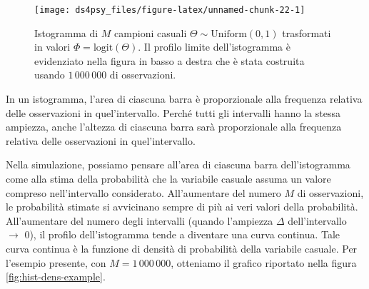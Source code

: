 \documentclass[
  11pt,
]{krantz}
\theoremstyle{definition}
\theoremstyle{definition}
\theoremstyle{definition}
\theoremstyle{definition}
\theoremstyle{remark}
\begin{document}
\begin{figure}[h]

{\centering \texttt{[image: ds4psy\_files/figure-latex/unnamed-chunk-22-1]} 

}

\caption{Istogramma di $M$ campioni casuali $\Theta \sim \mbox{Uniform}(0, 1)$ trasformati in valori $\Phi = \mbox{logit}(\Theta).$ Il profilo limite dell'istogramma è evidenziato nella figura in basso a destra che è stata costruita usando $1\,000\,000$ di osservazioni.}\label{fig:unnamed-chunk-22}
\end{figure}

In un istogramma, l'area di ciascuna barra è proporzionale alla frequenza relativa delle osservazioni in quel'intervallo. Perché tutti gli intervalli hanno la stessa ampiezza, anche l'altezza di ciascuna barra sarà proporzionale alla frequenza relativa delle osservazioni in quel'intervallo.

Nella simulazione, possiamo pensare all'area di ciascuna barra dell'istogramma come alla stima della probabilità che la variabile casuale assuma un valore compreso nell'intervallo considerato. All'aumentare del numero \(M\) di osservazioni, le probabilità stimate si avvicinano sempre di più ai veri valori della probabilità. All'aumentare del numero degli intervalli (quando l'ampiezza \(\Delta\) dell'intervallo \(\rightarrow\) 0), il profilo dell'istogramma tende a diventare una curva continua. Tale curva continua è la funzione di densità di probabilità della variabile casuale. Per l'esempio presente, con \(M =1\,000\,000\), otteniamo il grafico riportato nella figura \ref{fig:hist-dens-example}.
\end{document}
